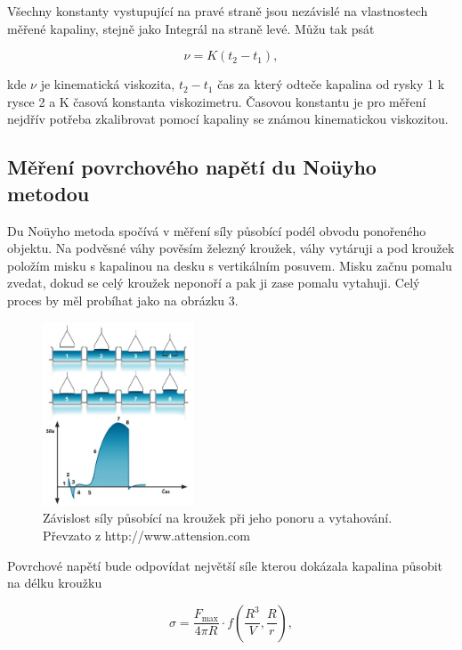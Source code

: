 \documentclass[a4paper,11pt]{article}
\begin{document}
Všechny konstanty vystupující na pravé straně jsou nezávislé na vlastnostech měřené kapaliny, stejně jako Integrál na straně levé. Můžu tak psát

\begin{equation}
\nu = K(t_2-t_1),
\end{equation}

kde $\nu$ je kinematická viskozita, $t_2-t_1$ čas za který odteče kapalina od rysky 1 k rysce 2 a K časová konstanta viskozimetru. Časovou konstantu je pro měření nejdřív potřeba zkalibrovat pomocí kapaliny se známou kinematickou viskozitou.

\subsection{Měření povrchového napětí du Noüyho metodou}

Du Noüyho metoda spočívá v měření síly působící podél obvodu ponořeného objektu. Na podvěsné váhy pověsím železný kroužek, váhy vytáruji a pod kroužek položím misku s kapalinou na desku s vertikálním posuvem. Misku začnu pomalu zvedat, dokud se celý kroužek neponoří a pak ji zase pomalu vytahuji. Celý proces by měl probíhat jako na obrázku 3.

\begin{figure}[htpb]
  \centering
  \includegraphics[width=0.4\textwidth]{nouyh.jpg}
  \caption{Závislost síly působící na kroužek při jeho ponoru a vytahování. Převzato
z http://www.attension.com}
\end{figure}

Povrchové napětí bude odpovídat největší síle kterou dokázala kapalina působit na délku kroužku

\begin{equation}
\sigma = \frac{F_{\text{max}}}{4 \pi R} \cdot f (\frac{R^3}{V}, \frac{R}{r}),
\end{equation}
\end{document}
